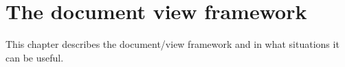 \chapter{The document view framework}\label{chapdocview}
%
%
\setfooter{\thepage}{}{}{}{}{\thepage}%

This chapter describes the document/view framework and in what situations it can be useful.

